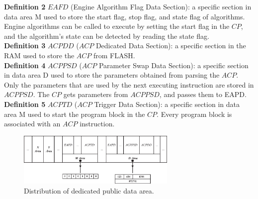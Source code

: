 \documentclass[journal]{IEEEtran}
\begin{document}
\textbf{Definition 2} $EAFD$ (Engine Algorithm Flag Data Section): a specific section in data area M used to store the start flag, stop flag, and state flag of algorithms. Engine algorithms can be called to execute by setting the start flag in the $CP$, and the algorithm's state can be detected by reading the state flag.\\

\textbf{Definition 3} $ACPDD$ ($ACP$ Dedicated Data Section): a specific section in the RAM used to store the \emph{$ACP$} from FLASH.\\

\textbf{Definition 4} $ACPPSD$ ($ACP$ Parameter Swap Data Section): a specific section in data area D used to store the parameters obtained from parsing the $ACP$. Only the parameters that are used by the next executing instruction are stored in $ACPPSD$. The $CP$ gets parameters from $ACPPSD$, and passes them to EAPD.\\

\textbf{Definition 5} $ACPTD$ ($ACP$ Trigger Data Section): a specific section in data area M used to start the program block in the $CP$. Every program block is associated with an $ACP$ instruction.

\begin{figure}
\centering
\includegraphics[width=3in]{fig/FIG6_TII-18-0024.eps}
\caption{Distribution of dedicated public data area.}
\label{fig:publicdataarea}
\end{figure}
\end{document}
